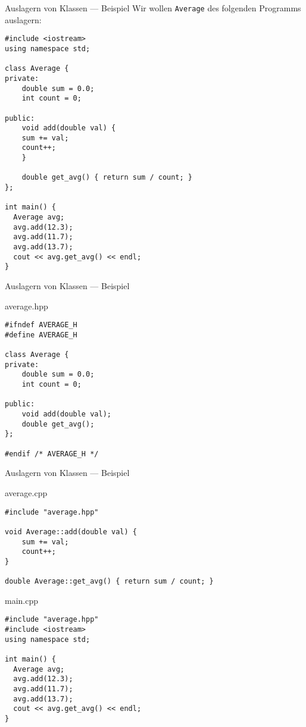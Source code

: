 \documentclass[presentation]{beamer}
\begin{document}
\begin{frame}[label={sec:org3e89397},fragile]{Auslagern von Klassen --- Beispiel}
 Wir wollen {\color{solarizedYellow}\verb!Average!} des folgenden Programms auslagern:
\begin{verbatim}
#include <iostream>
using namespace std;

class Average {
private:
    double sum = 0.0;
    int count = 0;

public:
    void add(double val) {
	sum += val;
	count++;
    }

    double get_avg() { return sum / count; }
};

int main() {
  Average avg;
  avg.add(12.3);
  avg.add(11.7);
  avg.add(13.7);
  cout << avg.get_avg() << endl;
}
\end{verbatim}
\end{frame}
\begin{frame}[label={sec:org2336224},fragile]{Auslagern von Klassen --- Beispiel}
 \begin{block}{average.hpp}
\begin{verbatim}
#ifndef AVERAGE_H
#define AVERAGE_H

class Average {
private:
    double sum = 0.0;
    int count = 0;

public:
    void add(double val);
    double get_avg();
};

#endif /* AVERAGE_H */
\end{verbatim}
\end{block}
\end{frame}
\begin{frame}[label={sec:org1e2d54d},fragile]{Auslagern von Klassen --- Beispiel}
 \begin{block}{average.cpp}
\begin{verbatim}
#include "average.hpp"

void Average::add(double val) {
    sum += val;
    count++;
}

double Average::get_avg() { return sum / count; }
\end{verbatim}
\end{block}
\begin{block}{main.cpp}
\begin{verbatim}
#include "average.hpp"
#include <iostream>
using namespace std;

int main() {
  Average avg;
  avg.add(12.3);
  avg.add(11.7);
  avg.add(13.7);
  cout << avg.get_avg() << endl;
}
\end{verbatim}
\end{block}
\end{frame}
\end{document}
